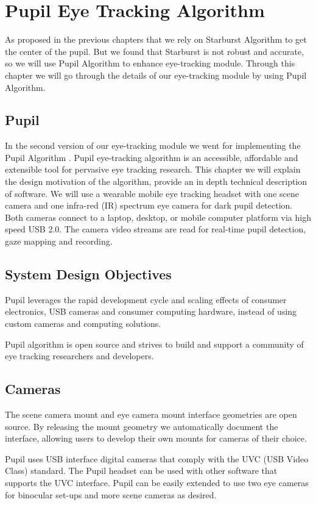 \documentclass[12pt,fleqn]{book} %
\begin{document}
\chapter{Pupil Eye Tracking Algorithm}
As proposed in the previous chapters that we rely on Starburst Algorithm to get the center of the pupil. But we found that Starburst is not robust and accurate, so we will use Pupil Algorithm to enhance eye-tracking module. Through this chapter we will go through the details of our eye-tracking module by using Pupil Algorithm.

\section{Pupil}
In the second version of our eye-tracking module we went for implementing the Pupil Algorithm \cite{pupil}. Pupil eye-tracking algorithm is an accessible, affordable and extensible tool for pervasive eye tracking research. This chapter we will explain the design motivation of the algorithm, provide an in depth technical description of software. We will use a wearable mobile eye tracking headset with one scene camera and one infra-red (IR) spectrum eye camera for dark pupil detection. Both cameras connect to a laptop, desktop, or mobile computer platform via high speed USB 2.0. The camera video streams are read for real-time pupil detection, gaze mapping and recording.  


\section{System Design Objectives}
Pupil leverages the rapid development cycle and scaling effects of consumer electronics, USB cameras and consumer computing hardware, instead of using custom cameras and computing solutions. \bigskip

Pupil algorithm is open source and strives to build and support a community of eye tracking researchers and developers.

\section{Cameras} 
The scene camera mount and eye camera mount interface geometries are open source. By releasing the mount geometry we automatically document the interface, allowing users to develop their own mounts for cameras of their choice. \bigskip

Pupil uses USB interface digital cameras that comply with the UVC (USB Video Class) standard. The Pupil headset can be used with other software that supports the UVC interface. Pupil can be easily extended to use two eye cameras for binocular set-ups and more scene cameras as desired. 
\end{document}
